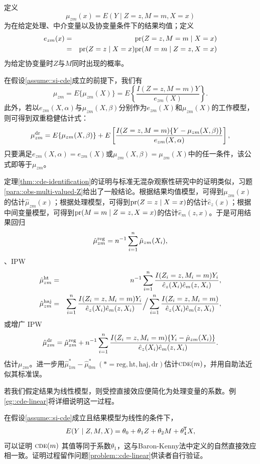定义
$$ 
\mu_{zm}(x) = E(Y\mid Z=z,M=m, X=x) 
$$
为在给定处理、中介变量以及协变量条件下的结果均值；定义
\begin{eqnarray*}
e_{zm}(x)  &=&  \textup{pr}(Z=z,M=m\mid X=x)  \\
&=& \textup{pr}(Z=z\mid X=x) \textup{pr}( M=m\mid Z=z, X=x)
\end{eqnarray*} 
为给定协变量时$Z$与$M$同时出现的概率。 

\begin{theorem}
\label{thm::cde-identification}
在假设\ref{assume::si-cde}成立的前提下，我们有
$$
\mu_{zm} = E\{  \mu_{zm}(X) \}
= E \left\{   \frac{I(Z=z, M=m) Y}{  e_{zm}(X)  }  \right\} .
$$
此外，若以$e_{zm}(X, \alpha) $与$\mu_{zm}(X, \beta) $分别作为$e_{zm}(X) $和$\mu_{zm}(X) $的工作模型，则可得到双重稳健估计式：
$$
\mu_{zm}^{\textup{dr}}  = E\{  \mu_{zm}(X, \beta) \} + E \left[   \frac{I(Z=z, M=m) \{ Y - \mu_{zm}(X, \beta)  \}}{  e_{zm}(X, \alpha)  }  \right],
$$
只要满足$e_{zm}(X, \alpha) = e_{zm}(X)$或$\mu_{zm}(X, \beta)  = \mu_{zm}(X)$中的任一条件，该公式即等于$\mu_{zm} $。
\end{theorem}



定理\ref{thm::cde-identification}的证明与标准无混杂观察性研究中的证明类似，习题\ref{para::obs-multi-valued-Z}给出了一般结论。根据结果均值模型，可得到$\mu_{zm}(x)$的估计$\hat{\mu}_{zm}(x) $；根据处理模型，可得到$\textup{pr}(Z=z\mid X = x)$的估计$\hat{e}_z(x)$；根据中间变量模型，可得到$\textup{pr}(M=m\mid Z=z, X=x)$的估计$\hat{e}_m(z,x)$。于是可用结果回归
$$
\hat{\mu}_{zm}^\text{reg} = n^{-1} \sum_{i=1}^n  \hat{\mu}_{zm}(X_i),
$$
、IPW
\begin{eqnarray*}
\hat{\mu}_{zm}^\text{ht} &=& n^{-1}\sum_{i=1}^n  \frac{  I(Z_i=z, M_i=m) Y_i  }{  \hat{e}_z(X_i)  \hat{e}_m(z,X_i)  } , \\
\hat{\mu}_{zm}^\text{haj} &=&  \sum_{i=1}^n  \frac{  I(Z_i=z, M_i=m) Y_i  }{  \hat{e}_z(X_i)  \hat{e}_m(z,X_i)  } \Big /  \sum_{i=1}^n  \frac{  I(Z_i=z, M_i=m)    }{  \hat{e}_z(X_i)  \hat{e}_m(z,X_i)  }, 
\end{eqnarray*}
或增广 IPW
$$
\hat{\mu}_{zm}^\text{dr} = \hat{\mu}_{zm}^\text{reg}  +  n^{-1} \sum_{i=1}^n  \frac{  I(Z_i=z, M_i=m) \{ Y_i - \hat{\mu}_{zm}(X_i)\}   }{  \hat{e}_z(X_i)  \hat{e}_m(z,X_i)  } .
$$
估计$\mu_{zm} $。进一步用$\hat{\mu}_{1m}^* - \hat{\mu}_{0m}^*\ (*=\text{reg}, \text{ht}, \text{haj}, \text{dr} )$估计$\textsc{cde}(m)$，并用自助法近似其标准误。 




若我们假定结果为线性模型，则受控直接效应便简化为处理变量的系数。例\ref{eg::cde-linear}将详细说明这一过程。 
\begin{example}
\label{eg::cde-linear}
在假设\ref{assume::si-cde}成立且结果模型为线性的条件下，
$$
E(Y\mid Z,M,X) = \theta_0 + \theta_1 Z + \theta_2 M +   \theta_4^{\mkern-1.5mu\mathsf{T}} X,
$$
可以证明
$
\textsc{cde}(m) 
$
其值等同于系数$ \theta_1$，这与Baron-Kenny法中定义的自然直接效应相一致。证明过程留作问题\ref{problem::cde-linear}供读者自行验证。 
\end{example}







